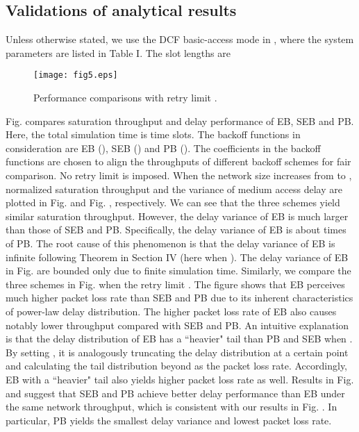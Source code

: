 \documentclass[journal]{IEEEtran}
\begin{document}
\subsection{Validations of analytical results}
Unless otherwise stated, we use the DCF basic-access mode in , where the system parameters are listed in Table I. The slot lengths are


\begin{figure}
\centering
  \begin{center}
    \texttt{[image: fig5.eps]}
  \end{center}
  \caption{Performance comparisons with retry limit .}
  \label{55}
\end{figure}

Fig.  compares saturation throughput and delay performance of EB, SEB and PB. Here, the total simulation time is  time slots. The backoff functions in consideration are EB (), SEB () and PB (). The coefficients in the backoff functions are chosen to align the throughputs of different backoff schemes for fair comparison. No retry limit is imposed. When the network size increases from  to , normalized saturation throughput and the variance of medium access delay are plotted in Fig.  and Fig. , respectively. We can see that the three schemes yield similar saturation throughput. However, the delay variance of EB is much larger than those of SEB and PB. Specifically, the delay variance of EB is about  times of PB. The root cause of this phenomenon is that the delay variance of EB is infinite following Theorem  in Section IV (here  when ). The delay variance of EB in Fig.  are bounded only due to finite simulation time. Similarly, we compare the three schemes in Fig.  when the retry limit . The figure shows that EB perceives much higher packet loss rate than SEB and PB due to its inherent characteristics of power-law delay distribution. The higher packet loss rate of EB also causes notably lower throughput compared with SEB and PB. An intuitive explanation is that the delay distribution of EB has a ``heavier" tail than PB and SEB when . By setting , it is analogously truncating the delay distribution at a certain point and calculating the tail distribution beyond as the packet loss rate. Accordingly, EB with a ``heavier" tail also yields higher packet loss rate as well. Results in Fig.  and  suggest that SEB and PB achieve better delay performance than EB under the same network throughput, which is consistent with our results in Fig. . In particular, PB yields the smallest delay variance and lowest packet loss rate.
\end{document}
